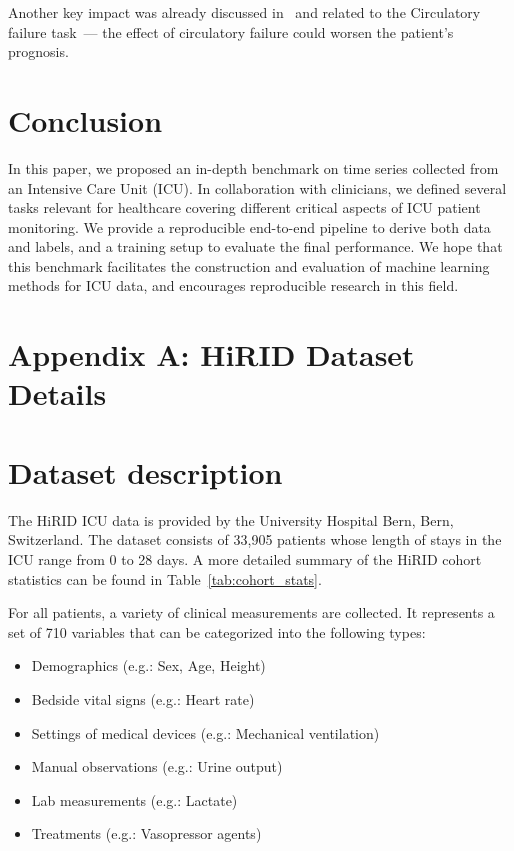 \documentclass{article}
\begin{document}
Another key impact was already discussed in~\cite{hyland2020early} and related to the Circulatory failure task~--- the effect of circulatory failure could worsen the patient's prognosis.

\fi


 \section{Conclusion}
In this paper, we proposed an in-depth benchmark on time series collected from an Intensive Care Unit (ICU). In collaboration with clinicians, we defined several tasks relevant for healthcare covering different critical aspects of ICU patient monitoring. We provide a reproducible end-to-end pipeline to derive both data and labels, and a training setup to evaluate the final performance. 
We hope that this benchmark facilitates the construction and evaluation of machine learning methods for ICU data, and encourages reproducible research in this field.






\appendix

\section{Appendix A: HiRID Dataset Details}



\section*{Dataset description}

The HiRID ICU data is provided by the University Hospital Bern, Bern, Switzerland.
The dataset consists of 33,905 patients whose length of stays in the ICU range from 0 to 28 days. A more detailed summary of the HiRID cohort statistics can be found in Table~\ref{tab:cohort_stats}.

For all patients, a variety of clinical measurements are collected. It represents a set of 710 variables that can be categorized into the following types:
\begin{itemize}
    \item Demographics (e.g.: Sex, Age, Height)
    \item Bedside vital signs (e.g.: Heart rate)
    \item Settings of medical devices (e.g.: Mechanical ventilation)
    \item Manual observations (e.g.: Urine output)
    \item Lab measurements (e.g.: Lactate)
    \item Treatments (e.g.: Vasopressor agents)
\end{itemize}
\end{document}
